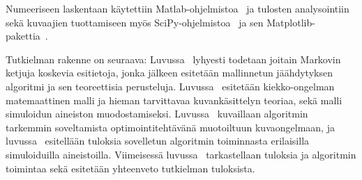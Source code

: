 Numeeriseen laskentaan käytettiin Matlab-ohjelmistoa~\cite{matlab2014a} ja tulosten analysointiin sekä kuvaajien tuottamiseen myös SciPy-ohjelmistoa~\cite{jones01scipy} ja sen Matplotlib-pakettia~\cite{hunter07matplotlib}.

Tutkielman rakenne on seuraava:
Luvussa~ lyhyesti todetaan joitain Markovin ketjuja koskevia esitietoja,
jonka jälkeen esitetään mallinnetun jäähdytyksen algoritmi ja sen teoreettisia perusteluja.
Luvussa~ esitetään kiekko-ongelman matemaattinen malli ja hieman tarvittavaa kuvankäsittelyn teoriaa,
sekä malli simuloidun aineiston muodostamiseksi.
Luvussa~ kuvaillaan algoritmin tarkemmin soveltamista optimointitehtävänä muotoiltuun kuvaongelmaan,
ja luvussa~ esitellään tuloksia sovelletun algoritmin toiminnasta erilaisilla simuloiduilla aineistoilla.
Viimeisessä luvussa~ tarkastellaan tuloksia ja algoritmin toimintaa sekä esitetään yhteenveto tutkielman tuloksista.

